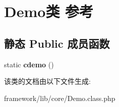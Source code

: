 \hypertarget{classDemo}{\section{Demo类 参考}
\label{classDemo}
}
\subsection*{静态 Public 成员函数}
\begin{DoxyCompactItemize}
\item 
\hypertarget{classDemo_a1f054c304228ce0b56da3195955ce6a6}{static {\bfseries cdemo} ()}\label{classDemo_a1f054c304228ce0b56da3195955ce6a6}

\end{DoxyCompactItemize}


该类的文档由以下文件生成\+:\begin{DoxyCompactItemize}
\item 
framework/lib/core/Demo.\+class.\+php\end{DoxyCompactItemize}
